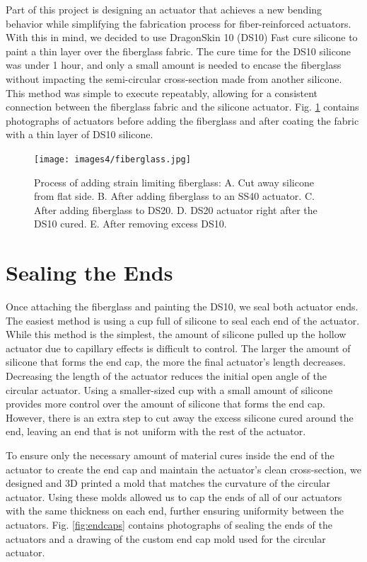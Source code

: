 Part of this project is designing an actuator that achieves a new bending behavior while simplifying the fabrication process for fiber-reinforced actuators. With this in mind, we decided to use DragonSkin 10 (DS10) Fast cure silicone to paint a thin layer over the fiberglass fabric. The cure time for the DS10 silicone was under 1 hour, and only a small amount is needed to encase the fiberglass without impacting the semi-circular cross-section made from another silicone. This method was simple to execute repeatably, allowing for a consistent connection between the fiberglass fabric and the silicone actuator. Fig. \ref{fig:fiberglass} contains photographs of actuators before adding the fiberglass and after coating the fabric with a thin layer of DS10 silicone. 

\begin{figure}[ht!]
    \centering
    \texttt{[image: images4/fiberglass.jpg]}
    \caption{Process of adding strain limiting fiberglass: A. Cut away silicone from flat side. B. After adding fiberglass to an SS40 actuator. C. After adding fiberglass to DS20. D. DS20 actuator right after the DS10 cured. E. After removing excess DS10.}
    \label{fig:fiberglass}
\end{figure}

\clearpage
\section{Sealing the Ends}
Once attaching the fiberglass and painting the DS10, we seal both actuator ends. The easiest method is using a cup full of silicone to seal each end of the actuator. While this method is the simplest, the amount of silicone pulled up the hollow actuator due to capillary effects is difficult to control. The larger the amount of silicone that forms the end cap, the more the final actuator's length decreases. Decreasing the length of the actuator reduces the initial open angle of the circular actuator. Using a smaller-sized cup with a small amount of silicone provides more control over the amount of silicone that forms the end cap. However, there is an extra step to cut away the excess silicone cured around the end, leaving an end that is not uniform with the rest of the actuator. 

To ensure only the necessary amount of material cures inside the end of the actuator to create the end cap and maintain the actuator's clean cross-section, we designed and 3D printed a mold that matches the curvature of the circular actuator. Using these molds allowed us to cap the ends of all of our actuators with the same thickness on each end, further ensuring uniformity between the actuators. Fig. \ref{fig:endcaps} contains photographs of sealing the ends of the actuators and a drawing of the custom end cap mold used for the circular actuator. 

